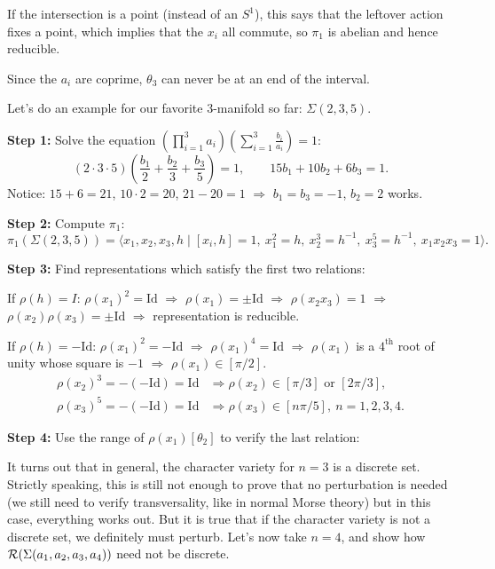 \documentclass[main]{subfiles}
\begin{document}
\begin{remark}
If the intersection is a point (instead of an $S^1$), this says that the leftover action fixes a point, which implies that the $x_i$ all commute, so $\pi_1$ is abelian and hence reducible.
\end{remark}

\begin{remark}
Since the $a_i$ are coprime, $\theta_3$ can never be at an end of the interval.
\end{remark}

Let's do an example for our favorite $3$-manifold so far: $\Sigma(2,3,5)$.

\textbf{Step 1:} Solve the equation $\left(\prod_{i=1}^3a_i\right)\left(\sum_{i=1}^3\frac{b_i}{a_i}\right)=1$:
\[
(2\cdot3\cdot5)\left(\frac{b_1}{2}+\frac{b_2}{3}+\frac{b_3}{5}\right) = 1, \qquad 15b_1+10b_2+6b_3=1.
\]
Notice: $15+6=21$, $10\cdot2=20$, $21-20=1$ $\Rightarrow$ $b_1=b_3=-1$, $b_2=2$ works.

\textbf{Step 2:} Compute $\pi_1$:
\[
\pi_1(\Sigma(2,3,5)) = \langle x_1,x_2,x_3,h \mid [x_i,h]=1,\ x_1^2=h,\ x_2^3=h^{-1},\ x_3^5=h^{-1},\ x_1x_2x_3=1\rangle.
\]

\textbf{Step 3:} Find representations which satisfy the first two relations:

If $\rho(h)=I$: $\rho(x_1)^2=\mathrm{Id}$ $\Rightarrow$ $\rho(x_1)=\pm\mathrm{Id}$ $\Rightarrow$ $\rho(x_2x_3)=1$ $\Rightarrow$ $\rho(x_2)\rho(x_3)=\pm\mathrm{Id}$ $\Rightarrow$ representation is reducible.

If $\rho(h)=-\mathrm{Id}$: $\rho(x_1)^2=-\mathrm{Id}$ $\Rightarrow$ $\rho(x_1)^4=\mathrm{Id}$ $\Rightarrow$ $\rho(x_1)$ is a $4^{\text{th}}$ root of unity whose square is $-1$ $\Rightarrow$ $\rho(x_1)\in[\pi/2]$.
\begin{align*}
\rho(x_2)^3 = -(-\mathrm{Id}) = \mathrm{Id} &\Rightarrow \rho(x_2)\in[\pi/3]\text{ or }[2\pi/3],\\
\rho(x_3)^5 = -(-\mathrm{Id}) = \mathrm{Id} &\Rightarrow \rho(x_3)\in[n\pi/5],\ n=1,2,3,4.
\end{align*}

\textbf{Step 4:} Use the range of $\rho(x_1)[\theta_2]$ to verify the last relation:

\textcolor{red}{}

It turns out that in general, the character variety for $n=3$ is a discrete set. Strictly speaking, this is still not enough to prove that no perturbation is needed (we still need to verify transversality, like in normal Morse theory) but in this case, everything works out. But it is true that if the character variety is not a discrete set, we definitely must perturb. Let's now take $n=4$, and show how $\mathcal{R}(\Sigma(a_1,a_2,a_3,a_4))$ need not be discrete.
\end{document}
